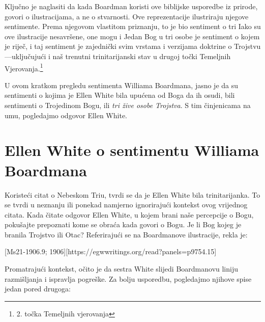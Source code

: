 Ključno je naglasiti da kada Boardman koristi ove biblijske usporedbe iz prirode, govori o ilustracijama, a ne o stvarnosti. Ove reprezentacije ilustriraju njegove sentimente. Prema njegovom vlastitom priznanju, to je bio sentiment o tri  Iako su ove ilustracije nesavršene, one mogu   i  Jedan Bog u tri osobe je sentiment o kojem je riječ, i taj sentiment je zajednički svim vrstama i verzijama doktrine o Trojstvu—uključujući i naš trenutni trinitarijanski stav u drugoj točki Temeljnih Vjerovanja.\footnote{ 2. točka Temeljnih vjerovanja}

U ovom kratkom pregledu sentimenta Williama Boardmana, jasno je da su sentimenti o kojima je Ellen White bila upućena od Boga da ih osudi, bili sentimenti o Trojedinom Bogu, ili \textit{tri žive osobe Trojstva}. S tim činjenicama na umu, pogledajmo odgovor Ellen White.

\section*{Ellen White o sentimentu Williama Boardmana}

Koristeći citat o Nebeskom Triu, tvrdi se da je Ellen White bila trinitarijanka. To se tvrdi u neznanju ili ponekad namjerno ignorirajući kontekst ovog vrijednog citata. Kada čitate odgovor Ellen White, u kojem brani naše percepcije o Bogu, pokušajte prepoznati kome se obraća kada govori o Bogu. Je li Bog kojeg je branila Trojstvo ili Otac? Referirajući se na Boardmanove ilustracije, rekla je:

[Ms21-1906.9; 1906][https://egwwritings.org/read?panels=p9754.15]

Promatrajući kontekst, očito je da sestra White slijedi Boardmanovu liniju razmišljanja i ispravlja pogreške. Za bolju usporedbu, pogledajmo njihove spise jedan pored drugoga:

